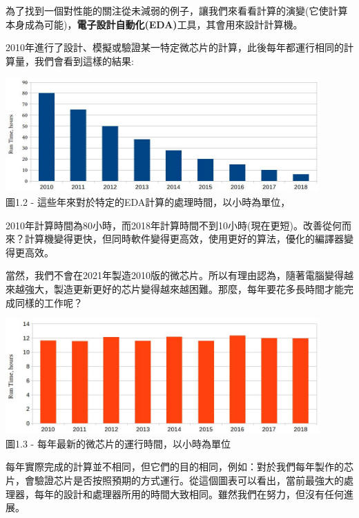 
為了找到一個對性能的關注從未減弱的例子，讓我們來看看計算的演變(它使計算本身成為可能)，\textbf{電子設計自動化(EDA)}工具，其會用來設計計算機。

2010年進行了設計、模擬或驗證某一特定微芯片的計算，此後每年都運行相同的計算量，我們會看到這樣的結果:

\begin{center}
\includegraphics[width=0.9\textwidth]{content/1/chapter1/images/2.jpg}\\
圖1.2 - 這些年來對於特定的EDA計算的處理時間，以小時為單位，
\end{center}

2010年計算時間為80小時，而2018年計算時間不到10小時(現在更短)。改善從何而來？計算機變得更快，但同時軟件變得更高效，使用更好的算法，優化的編譯器變得更高效。

當然，我們不會在2021年製造2010版的微芯片。所以有理由認為，隨著電腦變得越來越強大，製造更新更好的芯片變得越來越困難。那麼，每年要花多長時間才能完成同樣的工作呢？

\begin{center}
\includegraphics[width=0.9\textwidth]{content/1/chapter1/images/3.jpg}\\
圖1.3 - 每年最新的微芯片的運行時間，以小時為單位
\end{center}

每年實際完成的計算並不相同，但它們的目的相同，例如：對於我們每年製作的芯片，會驗證芯片是否按照預期的方式運行。從這個圖表可以看出，當前最強大的處理器，每年的設計和處理器所用的時間大致相同。雖然我們在努力，但沒有任何進展。

